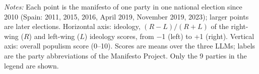 \par\smallskip\begin{minipage}{\linewidth}\scriptsize\textit{Notes:} Each point is the manifesto of one party in one national election since 2010 (Spain: 2011, 2015, 2016, April 2019, November 2019, 2023); larger points are later elections. Horizontal axis: ideology, $(R-L)/(R+L)$ of the right-wing ($R$) and left-wing ($L$) ideology scores, from $-$1 (left) to +1 (right). Vertical axis: overall populism score (0--10). Scores are means over the three LLMs; labels are the party abbreviations of the Manifesto Project. Only the 9 parties in the legend are shown.\end{minipage}
